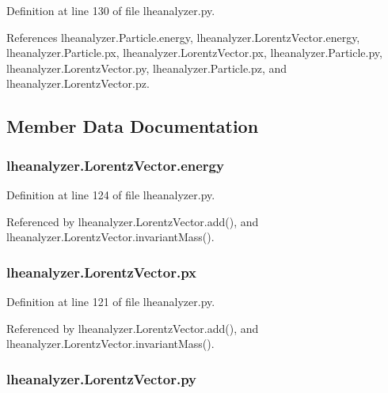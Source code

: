 Definition at line 130 of file lheanalyzer.\-py.



References lheanalyzer.\-Particle.\-energy, lheanalyzer.\-Lorentz\-Vector.\-energy, lheanalyzer.\-Particle.\-px, lheanalyzer.\-Lorentz\-Vector.\-px, lheanalyzer.\-Particle.\-py, lheanalyzer.\-Lorentz\-Vector.\-py, lheanalyzer.\-Particle.\-pz, and lheanalyzer.\-Lorentz\-Vector.\-pz.



\subsection{Member Data Documentation}
\subsubsection[{energy}]{\setlength{\rightskip}{0pt plus 5cm}lheanalyzer.\-Lorentz\-Vector.\-energy}\label{classlheanalyzer_1_1LorentzVector_ac898cd02348732dafbc2f9ecbd574fd1}


Definition at line 124 of file lheanalyzer.\-py.



Referenced by lheanalyzer.\-Lorentz\-Vector.\-add(), and lheanalyzer.\-Lorentz\-Vector.\-invariant\-Mass().

\subsubsection[{px}]{\setlength{\rightskip}{0pt plus 5cm}lheanalyzer.\-Lorentz\-Vector.\-px}\label{classlheanalyzer_1_1LorentzVector_a18b761634276030aac330992d1653323}


Definition at line 121 of file lheanalyzer.\-py.



Referenced by lheanalyzer.\-Lorentz\-Vector.\-add(), and lheanalyzer.\-Lorentz\-Vector.\-invariant\-Mass().

\subsubsection[{py}]{\setlength{\rightskip}{0pt plus 5cm}lheanalyzer.\-Lorentz\-Vector.\-py}\label{classlheanalyzer_1_1LorentzVector_ac0c783eebdfb891dc6d34fd9da1ddb17}


